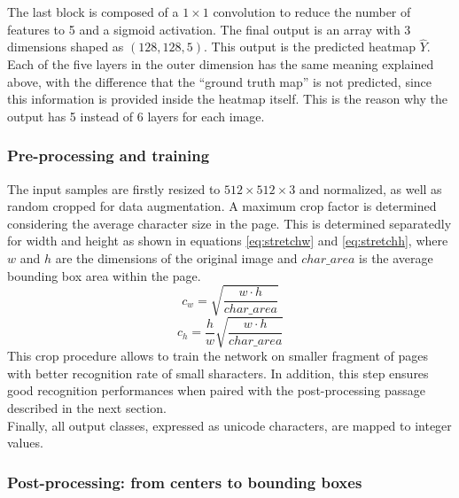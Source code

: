 The last block is composed of a $1 \times 1$ convolution to reduce the number of features to 5 and a sigmoid activation. The final output is an array with 3 dimensions shaped as $(128, 128, 5)$. This output is the predicted heatmap $\widehat{Y}$. Each of the five layers in the outer dimension has the same meaning explained above, with the difference that the “ground truth map” is not predicted, since this information is provided inside the heatmap itself. This is the reason why the output has 5 instead of 6 layers for each image.

\subsubsection{Pre-processing and training}
\label{sssec:preprocessingdet}

The input samples are firstly resized to $512 \times 512 \times 3$ and normalized, as well as random cropped for data augmentation. A maximum crop factor is determined considering the average character size in the page. This is determined separatedly for width and height as shown in equations \ref{eq:stretchw} and \ref{eq:stretchh}, where $w$ and $h$ are the dimensions of the original image and $char\_area$ is the average bounding box area within the page.
\begin{equation}\label{eq:stretchw}
	c_w=\sqrt{\frac{w \cdot h}{char\_area}}
\end{equation}
\begin{equation}
\label{eq:stretchh}
	c_h=\frac{h}{w}\sqrt{\frac{w \cdot h}{char\_area}}
\end{equation}
This crop procedure allows to train the network on smaller fragment of pages with better recognition rate of small sharacters. In addition, this step ensures good recognition performances when paired with the post-processing passage described in the next section.\\
\noindent Finally, all output classes, expressed as unicode characters, are mapped to integer values.

\subsubsection{Post-processing: from centers to bounding boxes}
\label{sssec:preprocessingandtraining}

